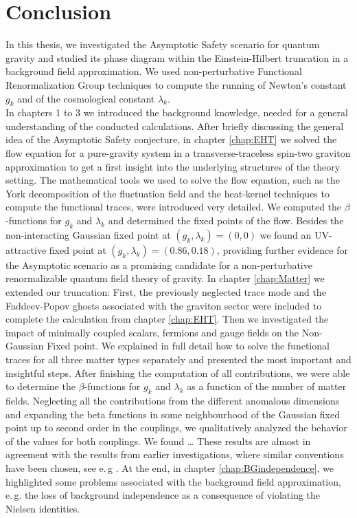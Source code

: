 \chapter{Conclusion}\label{chap:Conclusion}
In this thesis, we investigated the Asymptotic Safety scenario for quantum gravity and studied its phase diagram within the Einstein-Hilbert truncation in a background field approximation. We used non-perturbative Functional Renormalization Group techniques to compute the running of Newton's constant $g_k$ and of the cosmological constant $\lambda_k$.  \\

In chapters 1 to 3 we introduced the background knowledge, needed for a general understanding of the conducted calculations. After briefly discussing the general idea of the Asymptotic Safety conjecture, in chapter \ref{chap:EHT} we solved the flow equation for a pure-gravity system in a transverse-traceless spin-two graviton approximation to get a first insight into the underlying structures of the theory setting. The mathematical tools we used to solve the flow equation, such as the York decomposition of the fluctuation field and the heat-kernel techniques to compute the functional traces, were introduced very detailed. We computed the $\beta$-functions for $g_k$ and $\lambda_k$ and determined the fixed points of the flow. Besides the non-interacting Gaussian fixed point at $(g_k, \lambda_k)=(0, 0)$ we found an UV-attractive fixed point at $(g_k, \lambda_k)=(0.86, 0.18)$, providing further evidence for the Asymptotic scenario as a promising candidate for a non-perturbative renormalizable quantum field theory of gravity. In chapter \ref{chap:Matter} we extended our truncation: First, the previously neglected trace mode and the Faddeev-Popov ghosts associated with the graviton sector were included to complete the calculation from chapter \ref{chap:EHT}. Then we investigated the impact of minimally coupled scalars, fermions and gauge fields on the Non-Gaussian Fixed point. We explained in full detail how to solve the functional traces for all three matter types separately and presented the most important and insightful steps. After finishing the computation of all contributions, we were able to determine the $\beta$-functions for $g_k$ and $\lambda_k$ as a function of the number of matter fields. Neglecting all the contributions from the different anomalous dimensions and expanding the beta functions in some neighbourhood of the Gaussian fixed point up to second order in the couplings, we qualitatively analyzed the behavior of the values for both couplings. We found \dots
These results are almost in agreement with the results from earlier investigations, where similar conventions have been chosen, see e.\,g \cite{DonaEichhornPercacci2013}.
At the end, in chapter \ref{chap:BGindependence}, we highlighted some problems associated with the background field approximation, e.\,g. the loss of background independence as a consequence of violating the Nielsen identities. \\


